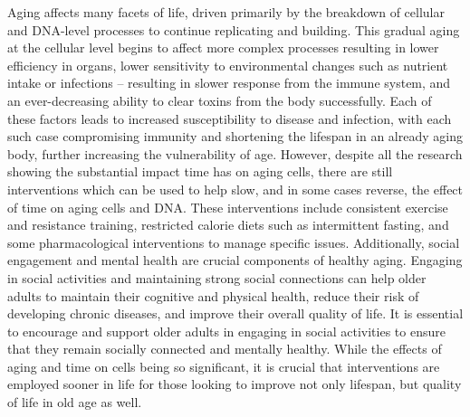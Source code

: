 \documentclass{article}
\begin{document}
Aging affects many facets of life, driven primarily by the breakdown of cellular and DNA-level processes to continue replicating and building. This gradual aging at the cellular level begins to affect more complex processes resulting in lower efficiency in organs, lower sensitivity to environmental changes such as nutrient intake or infections -- resulting in slower response from the immune system, and an ever-decreasing ability to clear toxins from the body successfully. Each of these factors leads to increased susceptibility to disease and infection, with each such case compromising immunity and shortening the lifespan in an already aging body, further increasing the vulnerability of age. However, despite all the research showing the substantial impact time has on aging cells, there are still interventions which can be used to help slow, and in some cases reverse, the effect of time on aging cells and DNA. These interventions include consistent exercise and resistance training, restricted calorie diets such as intermittent fasting, and some pharmacological interventions to manage specific issues. Additionally, social engagement and mental health are crucial components of healthy aging. Engaging in social activities and maintaining strong social connections can help older adults to maintain their cognitive and physical health, reduce their risk of developing chronic diseases, and improve their overall quality of life. It is essential to encourage and support older adults in engaging in social activities to ensure that they remain socially connected and mentally healthy. While the effects of aging and time on cells being so significant, it is crucial that interventions are employed sooner in life for those looking to improve not only lifespan, but quality of life in old age as well.


\newpage

\nocite{*}


    
\end{document}
